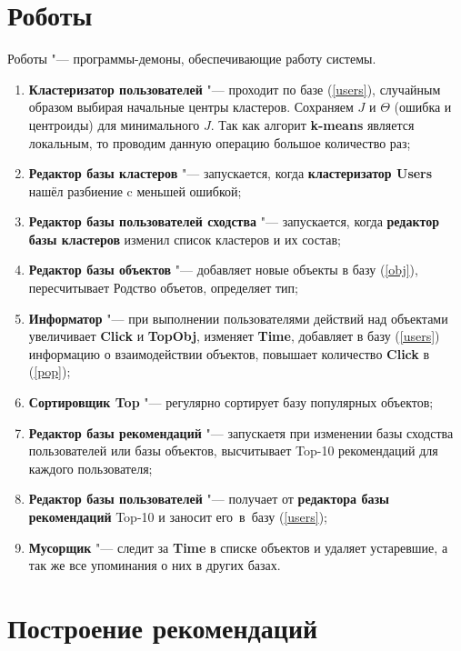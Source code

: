 \documentclass[a4paper,14pt]{article}
\begin{document}
\section{Роботы}
\begin{Def}
Роботы "--- программы-демоны, обеспечивающие работу системы.
\end{Def}
\begin{enumerate}
\item {\bf Кластеризатор пользователей} "--- проходит по базе (\ref{users}), случайным образом выбирая начальные центры кластеров. Сохраняем $J$ и $\Theta$ (ошибка и центроиды) для минимального $J$. Так как алгорит {\bf k-means} является локальным, то проводим данную операцию большое количество раз;
\item {\bf Редактор базы кластеров} "--- запускается, когда  {\bf кластеризатор Users} нашёл разбиение c меньшей ошибкой;
\item{\bf Редактор базы пользователей сходства } "--- запускается, когда  {\bf редактор базы кластеров} изменил список кластеров и их состав;
\item {\bf Редактор базы объектов} "--- добавляет новые объекты в базу  (\ref{obj}), пересчитывает Родство объетов, определяет тип;
\item {\bf Информатор} "--- при выполнении пользователями действий над объектами увеличивает {\bf Click} и {\bf TopObj}, изменяет {\bf Time}, добавляет в базу (\ref{users}) информацию о взаимодействии объектов, повышает количество {\bf Click} в (\ref{pop});
\item {\bf Сортировщик Top} "--- регулярно сортирует базу популярных объектов;
\item {\bf Редактор базы рекомендаций} "--- запускаетя при изменении базы сходства пользователей или базы объектов,  высчитывает Top-10 рекомендаций для каждого пользователя;
\item{\bf Редактор базы пользователей  } "--- получает от {\bf редактора базы рекомендаций} Top-10 и заносит его~в~базу (\ref{users});
\item {\bf Мусорщик} "--- следит за {\bf Time} в списке объектов и удаляет устаревшие, а так же все упоминания о них в других базах. 
\end{enumerate}

\section{Построение рекомендаций}
\end{document}
